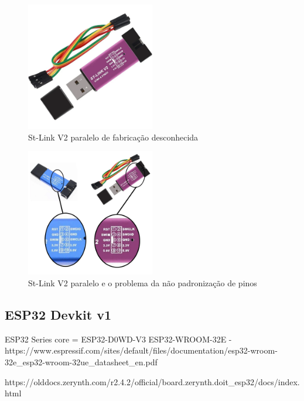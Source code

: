 \begin{figure}[htb]
	\centering
	\includegraphics[width=0.5\textwidth]{figures/stlinkv2_cheap}
	\caption{St-Link V2 paralelo de fabricação desconhecida}
    \label{stlinkv2_cheap}
\end{figure}


\begin{figure}[htb]
	\centering
	\includegraphics[width=0.5\textwidth]{figures/stlinkv2_cheap_pin_diff}
	\caption{St-Link V2 paralelo e o problema da não padronização de pinos}
    \label{stlinkv2_cheap}
\end{figure}





\subsection{ESP32 Devkit v1}




ESP32 Series
core = ESP32-D0WD-V3
ESP32-WROOM-32E - https://www.espressif.com/sites/default/files/documentation/esp32-wroom-32e_esp32-wroom-32ue_datasheet_en.pdf

https://olddocs.zerynth.com/r2.4.2/official/board.zerynth.doit_esp32/docs/index.html



